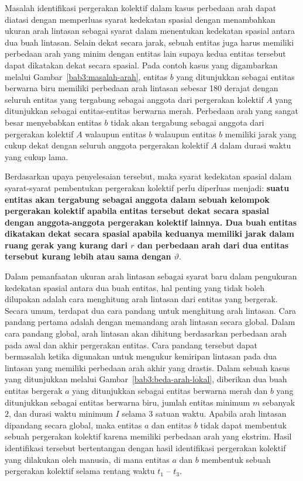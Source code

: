 Masalah identifikasi pergerakan kolektif dalam kasus perbedaan arah dapat diatasi dengan memperluas syarat kedekatan spasial dengan menambahkan ukuran arah lintasan sebagai syarat dalam menentukan kedekatan spasial antara dua buah lintasan. Selain dekat secara jarak, sebuah entitas juga harus memiliki perbedaan arah yang minim dengan entitas lain supaya kedua entitas tersebut dapat dikatakan dekat secara spasial. Pada contoh kasus yang digambarkan melalui Gambar~\ref{bab3:masalah-arah}, entitas $b$ yang ditunjukkan sebagai entitas berwarna biru memiliki perbedaan arah lintasan sebesar 180 derajat dengan seluruh entitas yang tergabung sebagai anggota dari pergerakan kolektif $A$ yang ditunjukkan sebagai entitas-entitas berwarna merah. Perbedaan arah yang sangat besar menyebabkan entitas $b$ tidak akan tergabung sebagai anggota dari pergerakan kolektif $A$ walaupun entitas $b$ walaupun entitas $b$ memiliki jarak yang cukup dekat dengan seluruh anggota pergerakan kolektif $A$ dalam durasi waktu yang cukup lama.

Berdasarkan upaya penyelesaian tersebut, maka syarat kedekatan spasial dalam syarat-syarat pembentukan pergerakan kolektif perlu diperluas menjadi: \textbf{suatu entitas akan tergabung sebagai anggota dalam sebuah kelompok pergerakan kolektif apabila entitas tersebut dekat secara spasial dengan anggota-anggota pergerakan kolektif lainnya. Dua buah entitas dikatakan dekat secara spasial apabila keduanya memiliki jarak dalam ruang gerak yang kurang dari $r$ dan perbedaan arah dari dua entitas tersebut kurang lebih atau sama dengan $\vartheta$}.

Dalam pemanfaatan ukuran arah lintasan sebagai syarat baru dalam pengukuran kedekatan spasial antara dua buah entitas, hal penting yang tidak boleh dilupakan adalah cara menghitung arah lintasan dari entitas yang bergerak. Secara umum, terdapat dua cara pandang untuk menghitung arah lintasan. Cara pandang pertama adalah dengan memandang arah lintasan secara global. Dalam cara pandang global, arah lintasan akan dihitung berdasarkan perbedaan arah pada awal dan akhir pergerakan entitas. Cara pandang tersebut dapat bermasalah ketika digunakan untuk mengukur kemiripan lintasan pada dua lintasan yang memiliki perbedaan arah akhir yang drastis. Dalam sebuah kasus yang ditunjukkan melalui Gambar~\ref{bab3:beda-arah-lokal}, diberikan dua buah entitas bergerak $a$ yang ditunjukkan sebagai entitas berwarna merah dan $b$ yang ditunjukkan sebagai entitas berwarna biru, jumlah entitas minimum $m$ sebanyak $2$, dan durasi waktu minimum $I$ selama $3$ satuan waktu. Apabila arah lintasan dipandang secara global, maka entitas $a$ dan entitas $b$ tidak dapat membentuk sebuah pergerakan kolektif karena memiliki perbedaan arah yang ekstrim. Hasil identifikasi tersebut bertentangan dengan hasil identifikasi pergerakan kolektif yang dilakukan oleh manusia, di mana entitas $a$ dan $b$ membentuk sebuah pergerakan kolektif selama rentang waktu $t_1$ -- $t_3$.

